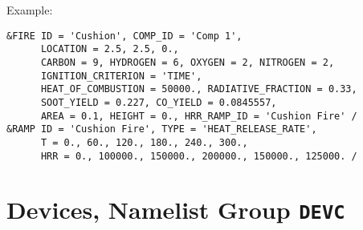 \vspace{\baselineskip}
\noindent Example:
\begin{lstlisting}
&FIRE ID = 'Cushion', COMP_ID = 'Comp 1',
      LOCATION = 2.5, 2.5, 0.,
      CARBON = 9, HYDROGEN = 6, OXYGEN = 2, NITROGEN = 2,
      IGNITION_CRITERION = 'TIME',
      HEAT_OF_COMBUSTION = 50000., RADIATIVE_FRACTION = 0.33,
      SOOT_YIELD = 0.227, CO_YIELD = 0.0845557,
      AREA = 0.1, HEIGHT = 0., HRR_RAMP_ID = 'Cushion Fire' /
&RAMP ID = 'Cushion Fire', TYPE = 'HEAT_RELEASE_RATE',
      T = 0., 60., 120., 180., 240., 300.,
      HRR = 0., 100000., 150000., 200000., 150000., 125000. /
\end{lstlisting}




\clearpage
\section{Devices, Namelist Group \texorpdfstring{{\tt DEVC}}{DEVC}}

\label{info:DEVC3}


